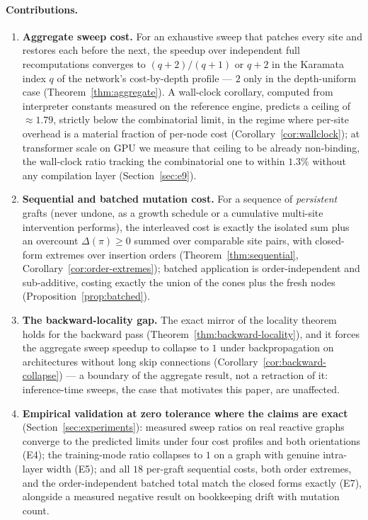 \documentclass[11pt,a4paper]{article}
\begin{document}
\paragraph{Contributions.}
\begin{enumerate}
    \item \textbf{Aggregate sweep cost.} For an exhaustive sweep that patches every site and restores each before the next, the speedup over independent full recomputations converges to $(q+2)/(q+1)$ or $q+2$ in the Karamata index $q$ of the network's cost-by-depth profile --- $2$ only in the depth-uniform case (Theorem~\ref{thm:aggregate}). A wall-clock corollary, computed from interpreter constants measured on the reference engine, predicts a ceiling of $\approx 1.79$, strictly below the combinatorial limit, in the regime where per-site overhead is a material fraction of per-node cost (Corollary~\ref{cor:wallclock}); at transformer scale on GPU we measure that ceiling to be already non-binding, the wall-clock ratio tracking the combinatorial one to within $1.3\%$ without any compilation layer (Section~\ref{sec:e9}).
    \item \textbf{Sequential and batched mutation cost.} For a sequence of \emph{persistent} grafts (never undone, as a growth schedule or a cumulative multi-site intervention performs), the interleaved cost is exactly the isolated sum plus an overcount $\Delta(\pi) \ge 0$ summed over comparable site pairs, with closed-form extremes over insertion orders (Theorem~\ref{thm:sequential}, Corollary~\ref{cor:order-extremes}); batched application is order-independent and sub-additive, costing exactly the union of the cones plus the fresh nodes (Proposition~\ref{prop:batched}).
    \item \textbf{The backward-locality gap.} The exact mirror of the locality theorem holds for the backward pass (Theorem~\ref{thm:backward-locality}), and it forces the aggregate sweep speedup to collapse to $1$ under backpropagation on architectures without long skip connections (Corollary~\ref{cor:backward-collapse}) --- a boundary of the aggregate result, not a retraction of it: inference-time sweeps, the case that motivates this paper, are unaffected.
    \item \textbf{Empirical validation at zero tolerance where the claims are exact} (Section~\ref{sec:experiments}): measured sweep ratios on real reactive graphs converge to the predicted limits under four cost profiles and both orientations (E4); the training-mode ratio collapses to $1$ on a graph with genuine intra-layer width (E5); and all $18$ per-graft sequential costs, both order extremes, and the order-independent batched total match the closed forms exactly (E7), alongside a measured negative result on bookkeeping drift with mutation count.
\end{enumerate}
\end{document}
